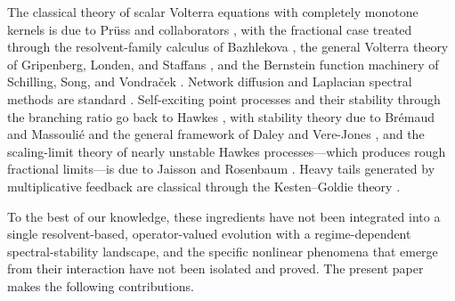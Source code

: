 \documentclass[11pt]{article}
\theoremstyle{plain}
\theoremstyle{definition}
\theoremstyle{remark}
\begin{document}
The classical theory of scalar Volterra equations with completely monotone kernels is due to
Pr\"uss and collaborators \cite{pruss1993evolution}, with the fractional case treated through
the resolvent-family calculus of Bazhlekova \cite{bazhlekova2001fractional}, the general Volterra
theory of Gripenberg, Londen, and Staffans \cite{gripenberg1990}, and the Bernstein
function machinery of Schilling, Song, and Vondra\v{c}ek \cite{schilling2012bernstein}. Network
diffusion and Laplacian spectral methods are standard \cite{chung1997spectral}. Self-exciting
point processes and their stability through the branching ratio go back to Hawkes
\cite{hawkes1971,hawkes1974}, with stability theory due to Br\'emaud and Massouli\'e
\cite{bremaud1996} and the general framework of Daley and Vere-Jones \cite{daley2003}, and the scaling-limit theory of nearly unstable Hawkes processes---which
produces rough fractional limits---is due to Jaisson and Rosenbaum
\cite{jaisson2015,jaisson2016}. Heavy tails generated by multiplicative feedback are classical
through the Kesten--Goldie theory \cite{kesten1973,goldie1991}.

To the best of our knowledge, these ingredients have not been integrated into a single
resolvent-based, operator-valued evolution with a regime-dependent spectral-stability landscape,
and the specific nonlinear phenomena that emerge from their interaction have not been isolated
and proved. The present paper makes the following contributions.
\end{document}
